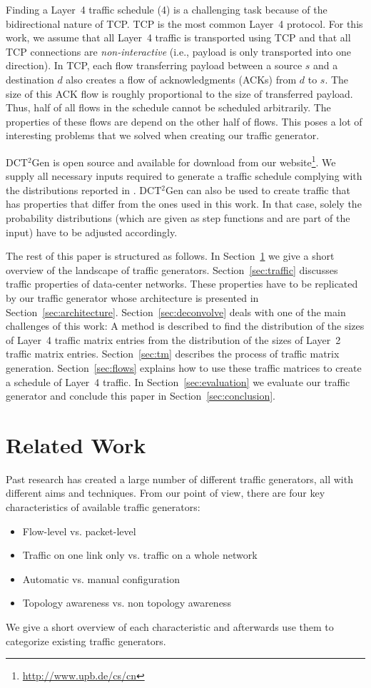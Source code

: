 \documentclass[journal,10pt]{IEEEtran}
\newcommand{\genname}{DCT${^2}$Gen}
\newcommand{\lf}{Layer~4}
\begin{document}
Finding a \lf{} traffic schedule (4) is a challenging task because of the bidirectional nature of TCP.
TCP is the most common Layer~4 protocol. For this work, we assume that all Layer~4 traffic is transported using TCP and that all TCP connections
are \emph{non-interactive} (i.e., payload is only transported into one direction).
In TCP, each flow transferring payload between a source $s$ and a destination $d$ also creates a flow of acknowledgments (ACKs) from $d$ to $s$.
The size of this ACK flow is roughly proportional to the size of transferred payload.
Thus, half of all flows in the schedule cannot be scheduled arbitrarily. The properties of these flows are depend on the other half of flows.
This poses a lot of interesting problems that we solved when creating our traffic generator.

\genname{} is open source and available for download from our website\footnote{\url{http://www.upb.de/cs/cn}}. 
We supply all necessary inputs required to generate a traffic schedule complying with the distributions reported in \cite{MSR-datacenters, datacentersInTheWild}.
\genname{} can also be used to create traffic that has properties that differ from the ones used in this work.
In that case, solely the probability distributions (which are given as step functions and are part of the input) have to be adjusted accordingly.

The rest of this paper is structured as follows. In Section~\ref{sec:relatedWork} we give a short overview of the landscape of 
traffic generators. Section~\ref{sec:traffic} discusses traffic properties of data-center networks. These properties have to be replicated by 
our traffic generator whose architecture is presented in Section~\ref{sec:architecture}.
Section~\ref{sec:deconvolve} deals with one of the main challenges of this work:
A method is described to find the
distribution of the sizes of Layer~4 traffic matrix entries from the distribution of the sizes of Layer~2 traffic matrix entries.
Section~\ref{sec:tm} describes the process of traffic matrix generation. Section~\ref{sec:flows} explains how to use these traffic matrices
to create a schedule of Layer~4 traffic. In Section~\ref{sec:evaluation} we evaluate our traffic generator and conclude this paper
in Section~\ref{sec:conclusion}.

\section{Related Work}
\label{sec:relatedWork}
Past research has created a large number of different traffic generators, all with different aims and techniques.
From our point of view, there are four key characteristics of available traffic generators:
\begin{itemize}
	\item Flow-level vs. packet-level
	\item Traffic on one link only vs. traffic on a whole network
	\item Automatic vs. manual configuration
	\item Topology awareness vs. non topology awareness
\end{itemize}
We give a short overview of each characteristic and afterwards use them to categorize existing traffic generators.
\end{document}
